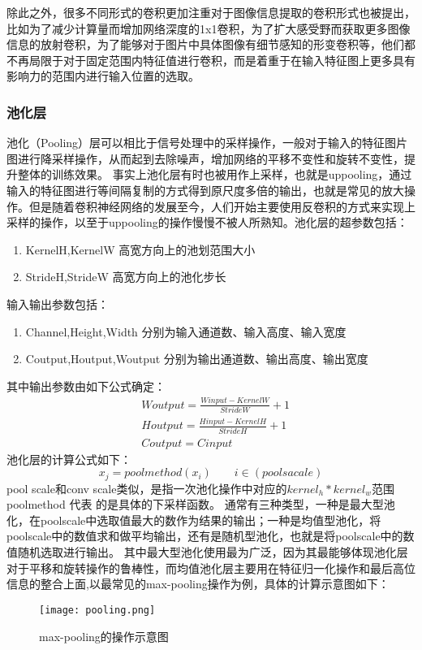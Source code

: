 除此之外，很多不同形式的卷积更加注重对于图像信息提取的卷积形式也被提出，比如为了减少计算量而增加网络深度的1x1卷积\cite{1x1CONV}，为了扩大感受野而获取更多图像信息的放射卷积\cite{DILUTECONV}，为了能够对于图片中具体图像有细节感知的形变卷积\cite{DEFORMCONV}等，他们都不再局限于对于固定范围内特征值进行卷积，而是着重于在输入特征图上更多具有影响力的范围内进行输入位置的选取。

\subsubsection{池化层}
池化（Pooling）层可以相比于信号处理中的采样操作，一般对于输入的特征图片图进行降采样操作，从而起到去除噪声，增加网络的平移不变性和旋转不变性，提升整体的训练效果。
事实上池化层有时也被用作上采样，也就是uppooling，通过输入的特征图进行等间隔复制的方式得到原尺度多倍的输出，也就是常见的放大操作。但是随着卷积神经网络的发展至今，人们开始主要使用反卷积的方式来实现上采样的操作，以至于uppooling的操作慢慢不被人所熟知。池化层的超参数包括：
\begin{enumerate}
\item KernelH,KernelW 高宽方向上的池划范围大小 
\item StrideH,StrideW 高宽方向上的池化步长
\end{enumerate}
输入输出参数包括：
\begin{enumerate}
\item Channel,Height,Width 分别为输入通道数、输入高度、输入宽度
\item  Coutput,Houtput,Woutput 分别为输出通道数、输出高度、输出宽度
\end{enumerate}
其中输出参数由如下公式确定：
\begin{equation}[h]
{
\begin{split}
 & Woutput= \frac{Winput-KernelW}{StrideW} +1 \\
 & Houtput= \frac{Hinput-KernelH}{StrideH} +1 \\
 & Coutput= Cinput
\end{split}
}\end{equation}
池化层的计算公式如下：
\begin{equation}[h]
{
x_j=poolmethod(x_i) \qquad  i\in (poolsacale)
}
\end{equation}
pool scale和conv scale类似，是指一次池化操作中对应的$kernel_h*kernel_w$范围
poolmethod 代表 的是具体的下采样函数。
通常有三种类型，一种是最大型池化，在poolscale中选取值最大的数作为结果的输出；一种是均值型池化，将poolscale中的数值求和做平均输出，还有是随机型池化，也就是将poolscale中的数值随机选取进行输出。
其中最大型池化使用最为广泛，因为其最能够体现池化层对于平移和旋转操作的鲁棒性，而均值池化层主要用在特征归一化操作和最后高位信息的整合上面,以最常见的max-pooling操作为例，具体的计算示意图如下：
\begin{figure}[!ht]
 \centering
	\texttt{[image: pooling.png]}
	\caption{max-pooling的操作示意图}
\end{figure}

